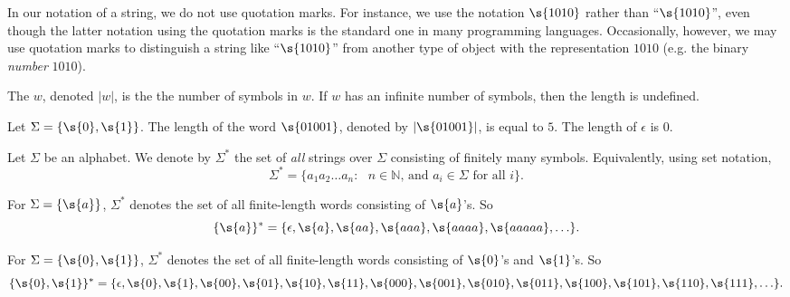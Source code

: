 \begin{note} \label{note:Strings-and-quotation-marks}
In our notation of a string, we do not use quotation marks. For instance, we use the notation $\s{1010}$ rather than ``$\s{1010}$'', even though the latter notation using the quotation marks is the standard one in many programming languages. Occasionally, however, we may use quotation marks to distinguish a string like ``$\s{1010}$'' from another type of object with the representation $1010$ (e.g. the binary \emph{number} $1010$).
\end{note}
\begin{flex}
\begin{definition} \label{definition:Length-of-a-string}
The  $w$, denoted $|w|$, is the the number of symbols in $w$. 
If $w$ has an infinite number of symbols, then the length is undefined.
\end{definition}
\begin{example} \label{example:Lengths-of-01001-and-epsilon}
Let $\Sigma=\{\s{0},\s{1}\}$. 
The length of the word $\s{01001}$, denoted by $|\s{01001}|$, is equal to $5$. 
The length of $\epsilon$ is 0.
\end{example}
\end{flex}
\begin{flex}
\begin{definition} \label{definition:Star-operation-on-alphabets}
Let $\Sigma$ be an alphabet. 
We denote by $\Sigma^*$ the set of \emph{all} strings over $\Sigma$ consisting of finitely many symbols. 
Equivalently, using set notation,
\[
    \Sigma^* = \{a_1a_2\ldots a_n : \text{ $n \in \mathbb{N}$, and $a_i \in \Sigma$ for all $i$}\}.
\]
\end{definition}
\begin{example}[$\{a\}^*$] \label{example:a}
For $\Sigma = \{\s{a}\}$, $\Sigma^*$ denotes the set of all finite-length words consisting of $\s{a}$'s. 
So
\[
    \{\s{a}\}^* = \{\epsilon, \s{a}, \s{aa}, \s{aaa}, \s{aaaa}, \s{aaaaa}, \ldots \}.
\]
\end{example}
\begin{example}[$\{0,1\}^*$] \label{example:01}
For $\Sigma = \{\s{0},\s{1}\}$, $\Sigma^*$ denotes the set of all finite-length words consisting of $\s{0}$'s and $\s{1}$'s. 
So
\[
    \{\s{0},\s{1}\}^* = \{\epsilon, \s{0}, \s{1}, \s{00}, \s{01}, \s{10}, \s{11}, \s{000}, \s{001}, \s{010}, \s{011}, \s{100}, \s{101}, \s{110}, \s{111}, \ldots\}.
\]
\end{example}
\end{flex}

